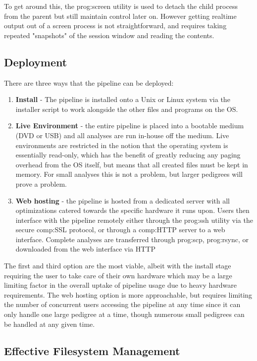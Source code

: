 To get around this, the \gls{prog:screen} utility is used to detach the child process from the parent but still maintain control later on. However getting realtime output out of a screen process is not straightforward, and requires taking repeated "snapshots" of the session window and reading the contents.


\subsection{Deployment}

There are three ways that the pipeline can be deployed:
\begin{enumerate}
\item{{\bf Install} - The pipeline is installed onto a Unix or Linux system via the installer script to work alongside the other files and programs on the OS.}
\item{{\bf Live Environment} - the entire pipeline is placed into a bootable medium (DVD or USB) and all analyses are run in-house off the medium. Live environments are restricted in the notion that the operating system is essentially read-only, which has the benefit of greatly reducing any paging overhead from the OS itself, but means that all created files must be kept in memory. For small analyses this is not a problem, but larger pedigrees will prove a problem.}
\item{{\bf Web hosting} - the pipeline is hosted from a dedicated server with all optimizations catered towards the specific hardware it runs upon. Users then interface with the pipeline remotely either through the \gls{prog:ssh} utility via the secure \gls{comp:SSL} protocol, or through a \gls{comp:HTTP} server to a web interface. Complete analyses are transferred through \gls{prog:scp}, \gls{prog:rsync}, or downloaded from the web interface via HTTP }
\end{enumerate}

The first and third option are the most viable, albeit with the install stage requiring the user to take care of their own hardware which may be a large limiting factor in the overall uptake of pipeline usage due to heavy hardware requirements. The web hosting option is more approachable, but requires limiting the number of concurrent users accessing the pipeline at any time since it can only handle one large pedigree at a time, though numerous small pedigrees can be handled at any given time.



\subsection{Effective Filesystem Management}

